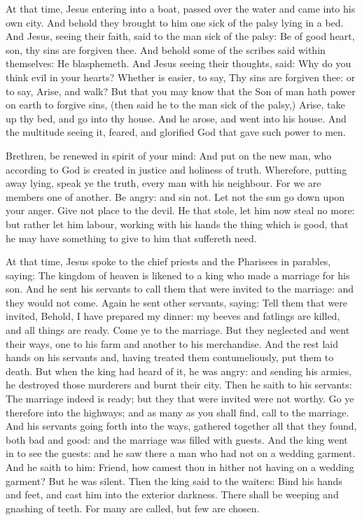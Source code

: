 \begin{multicols}{2}
At that time, Jesus entering into a boat, passed over the water and came into
his own city.
And behold they brought to him one sick of the palsy lying in a
bed. And Jesus, seeing their faith, said to the man sick of the palsy:
Be of good heart, son, thy sins are forgiven thee.
And behold some of the scribes said within themselves: He
blasphemeth.
And Jesus seeing their thoughts, said: Why do you think evil in
your hearts?
Whether is easier, to say, Thy sins are forgiven thee: or to say,
Arise, and walk?
But that you may know that the Son of man hath power on earth to
forgive sins, (then said he to the man sick of the palsy,) Arise, take
up thy bed, and go into thy house.
And he arose, and went into his house.
And the multitude seeing it, feared, and glorified God that gave
such power to men.


\bigskip



Brethren, be renewed in spirit of your mind:
And put on the new man, who according to God is created in justice
and holiness of truth.
Wherefore, putting away lying, speak ye the truth, every man with
his neighbour. For we are members one of another.
Be angry: and sin not. Let not the sun go down upon your anger.
Give not place to the devil.
He that stole, let him now steal no more: but rather let him
labour, working with his hands the thing which is good, that he may have
something to give to him that suffereth need.



At that time, Jesus spoke to the chief priests and the Pharisees in parables, saying:
The kingdom of heaven is likened to a king who made a marriage for
his son.
And he sent his servants to call them that were invited to the
marriage: and they would not come.
Again he sent other servants, saying: Tell them that were invited,
Behold, I have prepared my dinner: my beeves and fatlings are killed,
and all things are ready. Come ye to the marriage.
But they neglected and went their ways, one to his farm and
another to his merchandise.
And the rest laid hands on his servants and, having treated them
contumeliously, put them to death.
But when the king had heard of it, he was angry: and sending his
armies, he destroyed those murderers and burnt their city.
Then he saith to his servants: The marriage indeed is ready; but
they that were invited were not worthy.
Go ye therefore into the highways; and as many as you shall find,
call to the marriage.
And his servants going forth into the ways, gathered together all
that they found, both bad and good: and the marriage was filled with
guests.
And the king went in to see the guests: and he saw there a man
who had not on a wedding garment.
And he saith to him: Friend, how camest thou in hither not having
on a wedding garment? But he was silent.
Then the king said to the waiters: Bind his hands and feet, and
cast him into the exterior darkness. There shall be weeping and gnashing
of teeth.
For many are called, but few are chosen.



\end{multicols}

